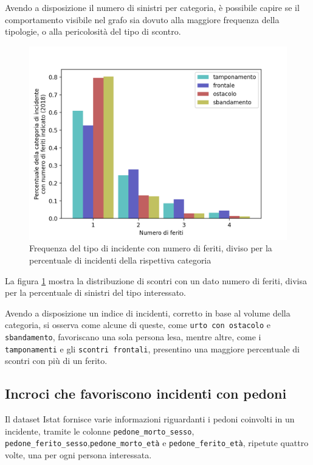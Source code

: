 \documentclass[a4paper,12pt]{report}
\newcommand{\columnstyle}[1]{\texttt{#1}}
\begin{document}
Avendo a disposizione il numero di sinistri per categoria, è possibile capire 
se il comportamento visibile nel grafo sia dovuto alla maggiore frequenza della tipologie, 
o alla pericolosità del tipo di scontro. 

\begin{figure}
    \includegraphics[width=\linewidth]{../src/incidenti/incidenti_senza_coords/natura_incidente/perc_natura_incidente.png}
    \caption{Frequenza del tipo di incidente con numero di feriti, diviso per la percentuale di incidenti della rispettiva categoria}
    \label{fig:perc-numero-feriti}
\end{figure}

La figura \ref{fig:perc-numero-feriti} mostra la distribuzione di scontri con un dato numero 
di feriti, divisa per la percentuale di sinistri del tipo interessato. 

Avendo a disposizione un indice di incidenti, corretto in base al volume della categoria, 
si osserva come alcune di queste, come \columnstyle{urto con ostacolo} 
e \columnstyle{sbandamento}, favoriscano una sola persona lesa, mentre altre, 
come i \columnstyle{tamponamenti} e gli \columnstyle{scontri frontali}, presentino 
una maggiore percentuale di scontri con più di un ferito. 

\subsection{Incroci che favoriscono incidenti con pedoni}

Il dataset Istat fornisce varie informazioni riguardanti i pedoni coinvolti in un 
incidente, tramite le colonne \columnstyle{pedone\_morto\_sesso}, 
\columnstyle{pedone\_ferito\_sesso},\columnstyle{pedone\_morto\_età} e 
\columnstyle{pedone\_ferito\_età}, ripetute quattro volte, una per ogni persona interessata. 
\end{document}
